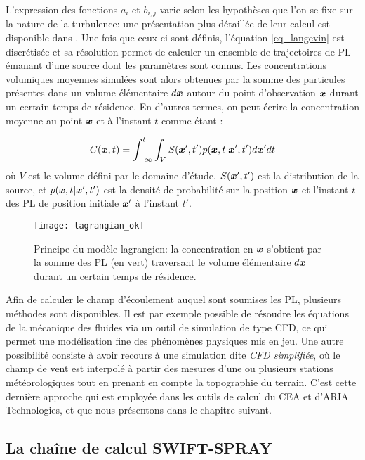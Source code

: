 L'expression des fonctions $a_i$ et $b_{i,j}$ varie selon les hypothèses que l'on se fixe sur la nature de la turbulence: une présentation plus détaillée de leur calcul est disponible dans \cite{Wilson1996}. Une fois que ceux-ci sont définis, l'équation \eqref{eq_langevin} est discrétisée et sa résolution permet de calculer un ensemble de trajectoires de PL émanant d'une source dont les paramètres sont connus. Les concentrations volumiques moyennes simulées sont alors obtenues par la somme des particules présentes dans un volume élémentaire $d{\bm{x}}$ autour du point d'observation ${\bm{x}}$ durant un certain temps de résidence. En d'autres termes, on peut écrire la concentration moyenne au point ${\bm{x}}$ et à l'instant $t$ comme étant : 

\begin{equation}
	C({\bm{x}}, t) = \int _{-\infty}^{t} \int_{V} S({\bm{x}}',t')p({\bm{x}}, t | {\bm{x}}', t')d{\bm{x}}'dt
	\label{eq_c_moyen_lagrangien}
\end{equation}
où $V$ est le volume défini par le domaine d'étude, $S({\bm{x}}',t')$ est la distribution de la source, et $p({\bm{x}}, t | {\bm{x}}', t')$ est la densité de probabilité sur la position ${\bm{x}}$ et l'instant $t$ des PL de position initiale ${\bm{x}}'$ à l'instant $t'$. \\

\begin{figure}
	\centering
	\texttt{[image: lagrangian\_ok]}
	\caption{Principe du modèle lagrangien: la concentration en ${\bm{x}}$ s'obtient par la somme des PL (en vert) traversant le volume élémentaire $d{\bm{x}}$ durant un certain temps de résidence.}
	\label{fig_schema_lagrangien}
\end{figure}

Afin de calculer le champ d'écoulement auquel sont soumises les PL, plusieurs méthodes sont disponibles. Il est par exemple possible de résoudre les équations de la mécanique des fluides via un outil de simulation de type CFD, ce qui permet une modélisation fine des phénomènes physiques mis en jeu. Une autre possibilité consiste à avoir recours à une simulation dite \textit{CFD simplifiée}, où le champ de vent est interpolé à partir des mesures d'une ou plusieurs stations météorologiques tout en prenant en compte la topographie du terrain. C'est cette dernière approche qui est employée dans les outils de calcul du CEA et d'ARIA Technologies, et que nous présentons dans le chapitre suivant. \\

\subsection{La chaîne de calcul SWIFT-SPRAY}

